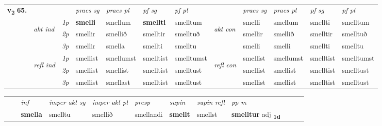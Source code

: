\begin{tabular}{llllllllllll} \toprule
\multirow{4}{*}{{{\textbf{v{\textsubscript{2}}} \Large{\textbf{65.}}}}}  & &   &  \textit{praes sg}  & \textit{praes pl}  &\textit{ pf sg} & \textit{pf pl} &  &  \textit{praes sg}  & \textit{praes pl}  & \textit{pf sg} & \textit{pf pl } \\*
	\cmidrule{4-7} \cmidrule{9-12}
 & \multirow{3}{*}{\begin{turn}{90}\textit{akt ind}\end{turn}} & {\textit{1p}} & \textbf{smelli} & smellum    & \textbf{smellti} & smelltum & \multirow{3}{*}{\begin{turn}{90}\textit{akt con}\end{turn}} &smelli & smellum & smellti & smelltum\\*
& &  {\textit{2p}} &  smellir  & smellið   & smelltir & smelltuð & & smellir & smellið & smelltir & smelltuð \\*
& &  {\textit{3p}} & smellir & smella   & smellti & smelltu & & smelli & smelli& smellti & smelltu  \\*
\cmidrule{4-7} \cmidrule{9-12}
 &\multirow{3}{*}{\begin{turn}{90}\textit{refl ind}\end{turn}} & {\textit{1p}} & smellist & smellumst    & smelltist & smelltumst & \multirow{3}{*}{\begin{turn}{90}\textit{refl con}\end{turn}}  &smellist & smellumst & smelltist & smelltumst\\*
 &&  {\textit{2p}} &  smellist  & smellist   & smelltist & smelltust & &smellist & smellist & smelltist & smelltust \\*
& &  {\textit{3p}} & smellist & smellast   & smelltist & smelltust & & smellist & smellist& smelltist & smelltust  \\*
\cmidrule{4-7} \cmidrule{9-12}
\end{tabular}


\begin{tabular}{llllllllllll}
 & & \textit{inf} & \textit{imper akt sg} & \textit{imper akt pl}   & \textit{presp} & \textit{supin} & \textit{supin refl} & \textit{pp m}     \\*
  & & \textbf{smella} & smelltu  & smellið   & smellandi &  \textbf{smellt} & smellst & \textbf{smelltur} adj \textbf{\textsubscript{1d}} \\*
\cmidrule{1-12}
\end{tabular}




